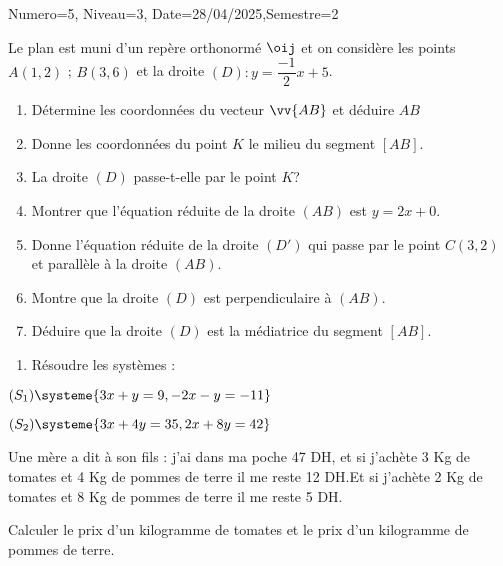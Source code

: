 \documentclass[a4paper,12pt]{article}
\begin{document}
\begin{Maquette}[DS]{Numero=5, Niveau=3, Date=28/04/2025,Semestre=2}

\begin{exercice}[BaremeDetaille=true]
Le plan est muni d'un repère orthonormé $\oij$ et on considère les points $A(1,2)$ ; $B(3,6)$ et la droite $(D):y=\dfrac{-1}{2}x+5$.
\begin{enumerate}
\item {}Détermine les coordonnées du vecteur $\vv{AB}$ et déduire $AB$\newline
\anserline[2]
\item {}Donne les coordonnées du point $K$ le milieu du segment $[AB]$.\newline
\anserline[2]
\item {}La droite $(D)$ passe-t-elle par le point $K$?
\newline
\anserline[2]
\item {}Montrer que l'équation réduite de la droite $(AB)$ est $y=2x+0$.
\newline
\anserline[4]
\item{} Donne l'équation réduite de la droite $(D')$ qui passe par le point $C(3,2)$ et parallèle à la droite $(AB)$.
\newline\anserline[4]
\item {}Montre que la droite $(D)$ est perpendiculaire à $(AB)$.\newline\anserline[4]
\item{} Déduire que la droite $(D)$ est la médiatrice du segment $[AB]$.\newline\anserline[3]
\end{enumerate}
\end{exercice}

\begin{exercice}
\begin{enumerate}
\item Résoudre les systèmes :
\end{enumerate}
\begin{multicols}{2}
$(S_1)\systeme{3x+y=9,-2x-y=-11}$\newline
\anserline[8]
\columnbreak

$(S_2)\systeme{3x+4y=35,2x+8y=42}$\newline
\anserline[8]
\end{multicols}
\end{exercice}

\begin{exercice}
Une mère a dit à son fils : j'ai dans ma poche 47 DH, et si j'achète 3 Kg de tomates et 4 Kg de pommes de terre il me reste 12 DH.Et si j'achète 2 Kg de tomates et 8 Kg de pommes de terre il me reste 5 DH.

Calculer le prix d'un kilogramme de tomates et le prix d'un kilogramme de pommes de terre.
\begin{multicols}{2}
\anserline[10]
\end{multicols}
\end{exercice}
\end{Maquette}
\end{document}
